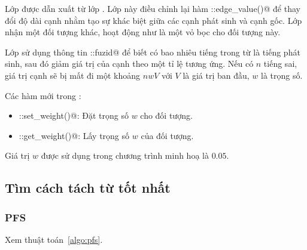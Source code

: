 \documentclass[a4paper,oneside,14pt]{extbook} %
\begin{document}
Lớp \verb@PenaltyDAG@ được dẫn xuất từ lớp \verb@DAG@. Lớp này điều
chỉnh lại hàm \verb@DAG::edge_value()@ để thay đổi độ dài cạnh nhằm
tạo sự khác biệt giữa các cạnh phát sinh và cạnh gốc. Lớp nhận một đối
tượng \verb@DAG@ khác, hoạt động như là một vỏ bọc cho đối tượng này.

Lớp sử dụng thông tin \verb@WordEntry::fuzid@ để biết có bao nhiêu
tiếng trong từ là tiếng phát sinh, sau đó giảm giá trị của cạnh theo
một tỉ lệ tương ứng. Nếu có $n$ tiếng sai, giá trị cạnh sẽ bị mất đi
một khoảng $nwV$
với $V$ là giá trị ban đầu, $w$ là trọng số.

Các hàm mới trong \verb@PenaltyDAG@:
\begin{itemize}
\item \verb@PenaltyDAG::set_weight()@: Đặt trọng số $w$ cho đối tượng.
\item \verb@PenaltyDAG::get_weight()@: Lấy trọng số $w$ của đối tượng.
\end{itemize}

Giá trị $w$ được sử dụng trong chương trình minh hoạ là $0.05$. 


\subsection{Tìm cách tách từ tốt nhất}


\subsubsection{PFS}

Xem thuật toán~\ref{algo:pfs}.
\end{document}
